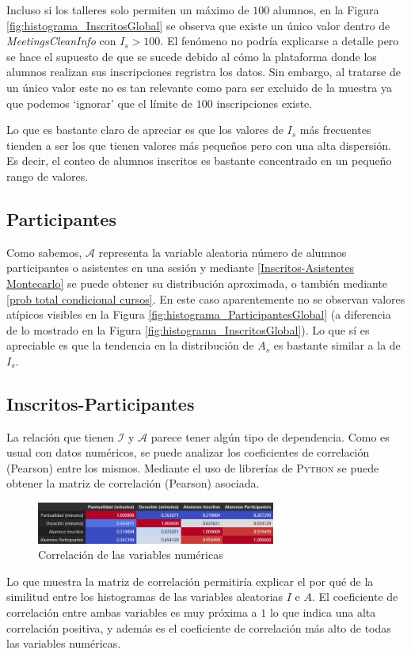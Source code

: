 \documentclass[11pt,a4paper]{book}
\theoremstyle{definition}%
\begin{document}
                Incluso si los talleres solo permiten un máximo de $100$ alumnos, en la Figura \ref{fig:histograma_InscritosGlobal} se observa que existe un único valor dentro de \textit{MeetingsCleanInfo} con $I_s>100$. El fenómeno no podría explicarse a detalle pero se hace el supuesto de que se sucede debido al cómo la plataforma donde los alumnos realizan sus inscripciones regristra los datos. Sin embargo, al tratarse de un único valor este no es tan relevante como para ser excluido de la muestra ya que podemos `ignorar' que el límite de $100$ inscripciones existe.

                Lo que es bastante claro de apreciar es que los valores de $I_s$ más frecuentes tienden a ser los que tienen valores más pequeños pero con una alta dispersión. Es decir, el conteo de alumnos inscritos es bastante concentrado en un pequeño rango de valores.
            \subsection{Participantes}
                Como sabemos, $\mathcal{A}$ representa la variable aleatoria número de alumnos participantes o asistentes en una sesión y mediante \ref{Inscritos-Asistentes Montecarlo} se puede obtener su distribución aproximada, o también mediante \ref{prob total condicional cursos}. En este caso aparentemente no se observan valores atípicos visibles en la Figura \ref{fig:histograma_ParticipantesGlobal} (a diferencia de lo mostrado en la Figura \ref{fig:histograma_InscritosGlobal}). Lo que sí es apreciable es que la tendencia en la distribución de $A_s$ es bastante similar a la de $I_s$.
            \subsection{Inscritos-Participantes}
                La relación que tienen $\mathcal{I}$ y $\mathcal{A}$ parece tener algún tipo de dependencia. Como es usual con datos numéricos, se puede analizar los coeficientes de correlación (Pearson) entre los mismos. Mediante el uso de librerías de \textsc{Python} se puede obtener la matriz de correlación (Pearson) asociada.
                \begin{figure}[H]
                    \centering
                    \includegraphics[width=0.7\textwidth]{Sources/corrmatrix_NumericalFeatures.png}
                    \caption{Correlación de las variables numéricas}
                    \label{fig:corrmatrix_NumericalFeatures}
                \end{figure}
                Lo que muestra la matriz de correlación permitiría explicar el por qué de la similitud entre los histogramas de las variables aleatorias $I$ e $A$. El coeficiente de correlación entre ambas variables es muy próxima a $1$ lo que indica una alta correlación positiva, y además es el coeficiente de correlación más alto de todas las variables numéricas.
                
\end{document}
